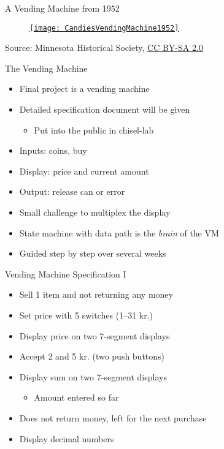 \begin{frame}[fragile]{A Vending Machine from 1952}
\begin{figure}
    \centering
    \href{https://en.wikipedia.org/wiki/File:CandiesVendingMachine1952.jpg}{\texttt{[image: CandiesVendingMachine1952]}}

\end{figure}

{\tiny Source: Minnesota Historical Society, \href{https://creativecommons.org/licenses/by-sa/2.0}{CC BY-SA 2.0}}
\end{frame}

\begin{frame}[fragile]{The Vending Machine}
\begin{itemize}
\item Final project is a vending machine
\item Detailed specification document will be given
\begin{itemize}
\item Put into the public in chisel-lab
\end{itemize}
\item Inputs: coins, buy
\item Display: price and current amount
\item Output: release can or error
\item Small challenge to multiplex the display
\item State machine with data path is the \emph{brain} of the VM
\item Guided step by step over several weeks
\end{itemize}
\end{frame}

\begin{frame}[fragile]{Vending Machine Specification I}
\begin{itemize}
\item Sell 1 item and not returning any money
\item Set price with 5 switches (1--31 kr.)
\item Display price on two 7-segment displays
\item Accept 2 and 5 kr. (two push buttons)
\item Display sum on two 7-segment displays
\begin{itemize}
\item Amount entered so far
\end{itemize}
\item Does not return money, left for the next purchase
\item Display decimal numbers
\end{itemize}
\end{frame}

